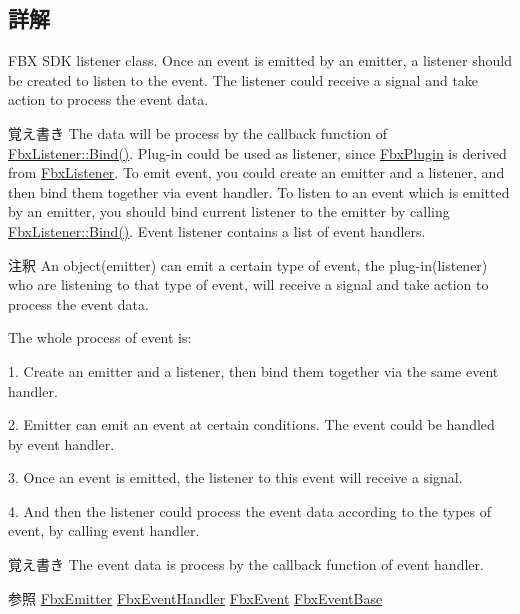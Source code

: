 \subsection{詳解}
F\+BX S\+DK listener class. Once an event is emitted by an emitter, a listener should be created to listen to the event. The listener could receive a signal and take action to process the event data. \begin{DoxyNote}{覚え書き}
The data will be process by the callback function of \hyperlink{class_fbx_listener_a7a3298b1f4fa347aaa2cb5136265a178}{Fbx\+Listener\+::\+Bind()}. Plug-\/in could be used as listener, since \hyperlink{class_fbx_plugin}{Fbx\+Plugin} is derived from \hyperlink{class_fbx_listener}{Fbx\+Listener}. To emit event, you could create an emitter and a listener, and then bind them together via event handler. To listen to an event which is emitted by an emitter, you should bind current listener to the emitter by calling \hyperlink{class_fbx_listener_a7a3298b1f4fa347aaa2cb5136265a178}{Fbx\+Listener\+::\+Bind()}. Event listener contains a list of event handlers. 
\end{DoxyNote}
\begin{DoxyRemark}{注釈}
An object(emitter) can emit a certain type of event, the plug-\/in(listener) who are listening to that type of event, will receive a signal and take action to process the event data. 
\end{DoxyRemark}
\begin{DoxyParagraph}{The whole process of event is\+:}
\begin{DoxyItemize}
\item 1. Create an emitter and a listener, then bind them together via the same event handler. \item 2. Emitter can emit an event at certain conditions. The event could be handled by event handler. \item 3. Once an event is emitted, the listener to this event will receive a signal. \item 4. And then the listener could process the event data according to the types of event, by calling event handler. \end{DoxyItemize}

\end{DoxyParagraph}
\begin{DoxyNote}{覚え書き}
The event data is process by the callback function of event handler. 
\end{DoxyNote}
\begin{DoxySeeAlso}{参照}
\hyperlink{class_fbx_emitter}{Fbx\+Emitter} \hyperlink{class_fbx_event_handler}{Fbx\+Event\+Handler} \hyperlink{class_fbx_event}{Fbx\+Event} \hyperlink{class_fbx_event_base}{Fbx\+Event\+Base} 
\end{DoxySeeAlso}


